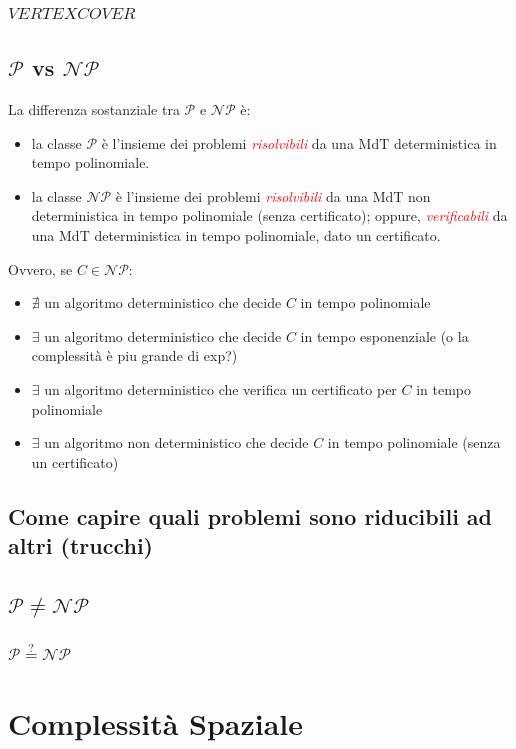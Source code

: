 \documentclass{article}  %
\theoremstyle{definition}
\begin{document}
\subsubsection{$VERTEX COVER$}
\subsection{$\mathcal{P}$ vs $\mathcal{NP}$}
La differenza sostanziale tra $\mathcal{P}$ e $\mathcal{NP}$ è:
\begin{itemize}
	\item la classe $\mathcal{P}$ è l'insieme dei problemi \textcolor{red}{\textit{risolvibili}} da una MdT deterministica in tempo polinomiale.
	\item la classe $\mathcal{NP}$ è l'insieme dei problemi \textcolor{red}{\textit{risolvibili}} da una MdT non deterministica in tempo polinomiale (senza
	      certificato); oppure,\textcolor{red}{\textit{ verificabili}} da una MdT deterministica in tempo polinomiale, dato un certificato.
\end{itemize}
Ovvero, se $C \in \mathcal{NP}$:
\begin{itemize}
	\item $\nexists$ un algoritmo deterministico che decide $C$ in tempo polinomiale
	\item $\exists$ un algoritmo deterministico che decide $C$ in tempo esponenziale (o la complessità è piu grande di exp?)
	\item $\exists$ un algoritmo deterministico che verifica un certificato per $C$ in tempo polinomiale
	\item $\exists$ un algoritmo non deterministico che decide $C$ in tempo polinomiale (senza un certificato)
\end{itemize}




\subsection{Come capire quali problemi sono riducibili ad altri (trucchi)}
\subsection{$\mathcal{P} \neq \mathcal{NP}$}
\subsubsection{$\mathcal{P} \overset{?}{=} \mathcal{NP}$}
\break
\section{Complessità Spaziale}
\end{document}
